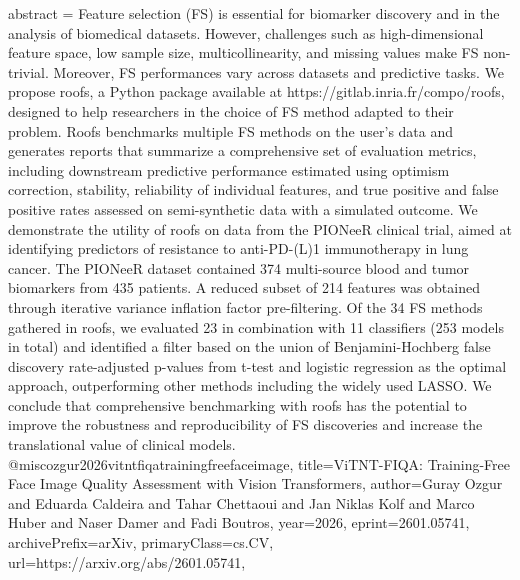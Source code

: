 {      abstract = {Feature selection (FS) is essential for biomarker discovery and in the analysis of biomedical datasets. However, challenges such as high-dimensional feature space, low sample size, multicollinearity, and missing values make FS non-trivial. Moreover, FS performances vary across datasets and predictive tasks. We propose roofs, a Python package available at https://gitlab.inria.fr/compo/roofs, designed to help researchers in the choice of FS method adapted to their problem. Roofs benchmarks multiple FS methods on the user's data and generates reports that summarize a comprehensive set of evaluation metrics, including downstream predictive performance estimated using optimism correction, stability, reliability of individual features, and true positive and false positive rates assessed on semi-synthetic data with a simulated outcome. We demonstrate the utility of roofs on data from the PIONeeR clinical trial, aimed at identifying predictors of resistance to anti-PD-(L)1 immunotherapy in lung cancer. The PIONeeR dataset contained 374 multi-source blood and tumor biomarkers from 435 patients. A reduced subset of 214 features was obtained through iterative variance inflation factor pre-filtering. Of the 34 FS methods gathered in roofs, we evaluated 23 in combination with 11 classifiers (253 models in total) and identified a filter based on the union of Benjamini-Hochberg false discovery rate-adjusted p-values from t-test and logistic regression as the optimal approach, outperforming other methods including the widely used LASSO. We conclude that comprehensive benchmarking with roofs has the potential to improve the robustness and reproducibility of FS discoveries and increase the translational value of clinical models.}
}@misc{ozgur2026vitntfiqatrainingfreefaceimage,
      title={ViTNT-FIQA: Training-Free Face Image Quality Assessment with Vision Transformers}, 
      author={Guray Ozgur and Eduarda Caldeira and Tahar Chettaoui and Jan Niklas Kolf and Marco Huber and Naser Damer and Fadi Boutros},
      year={2026},
      eprint={2601.05741},
      archivePrefix={arXiv},
      primaryClass={cs.CV},
      url={https://arxiv.org/abs/2601.05741},
}

